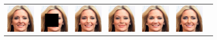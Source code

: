 \begin{figure}
\begin{center}
\begin{tabular}{ccccccc}
        \includegraphics[width=.145\textwidth]{Chapter2/samples/extended_results/inpainting/20/x.png} &   
        \includegraphics[width=.145\textwidth]{Chapter2/samples/extended_results/inpainting/20/y.png} &
        \includegraphics[width=.145\textwidth]{Chapter2/samples/extended_results/inpainting/20/CDE.png} & 
        \includegraphics[width=.145\textwidth]{Chapter2/samples/extended_results/inpainting/20/CDiffE.png} &
        \includegraphics[width=.145\textwidth]{Chapter2/samples/extended_results/inpainting/20/cmde.png} &
        \includegraphics[width=.145\textwidth]{Chapter2/samples/extended_results/inpainting/20/VS-CMDE.png}\\
        

\end{tabular}
\end{center}
\end{figure}
